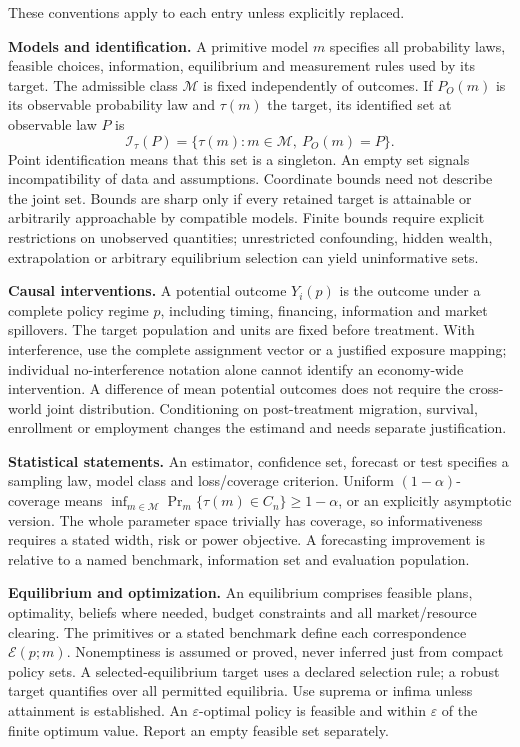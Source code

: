 \documentclass[11pt,a4paper]{article}
\begin{document}
These conventions apply to each entry unless explicitly replaced.

\textbf{Models and identification.} A primitive model \(m\) specifies all probability laws, feasible choices, information, equilibrium and measurement rules used by its target. The admissible class \(\mathcal M\) is fixed independently of outcomes. If \(P_O(m)\) is its observable probability law and \(\tau(m)\) the target, its identified set at observable law \(P\) is
\[
 \mathcal I_\tau(P)=\{\tau(m):m\in\mathcal M,\ P_O(m)=P\}.
\]
Point identification means that this set is a singleton. An empty set signals incompatibility of data and assumptions. Coordinate bounds need not describe the joint set. Bounds are sharp only if every retained target is attainable or arbitrarily approachable by compatible models. Finite bounds require explicit restrictions on unobserved quantities; unrestricted confounding, hidden wealth, extrapolation or arbitrary equilibrium selection can yield uninformative sets.

\textbf{Causal interventions.} A potential outcome \(Y_i(p)\) is the outcome under a complete policy regime \(p\), including timing, financing, information and market spillovers. The target population and units are fixed before treatment. With interference, use the complete assignment vector or a justified exposure mapping; individual no-interference notation alone cannot identify an economy-wide intervention. A difference of mean potential outcomes does not require the cross-world joint distribution. Conditioning on post-treatment migration, survival, enrollment or employment changes the estimand and needs separate justification.

\textbf{Statistical statements.} An estimator, confidence set, forecast or test specifies a sampling law, model class and loss/coverage criterion. Uniform \((1-\alpha)\)-coverage means \(\inf_{m\in\mathcal M}\Pr_m\{\tau(m)\in C_n\}\geq1-\alpha\), or an explicitly asymptotic version. The whole parameter space trivially has coverage, so informativeness requires a stated width, risk or power objective. A forecasting improvement is relative to a named benchmark, information set and evaluation population.

\textbf{Equilibrium and optimization.} An equilibrium comprises feasible plans, optimality, beliefs where needed, budget constraints and all market/resource clearing. The primitives or a stated benchmark define each correspondence \(\mathcal E(p;m)\). Nonemptiness is assumed or proved, never inferred just from compact policy sets. A selected-equilibrium target uses a declared selection rule; a robust target quantifies over all permitted equilibria. Use suprema or infima unless attainment is established. An \(\varepsilon\)-optimal policy is feasible and within \(\varepsilon\) of the finite optimum value. Report an empty feasible set separately.
\end{document}
